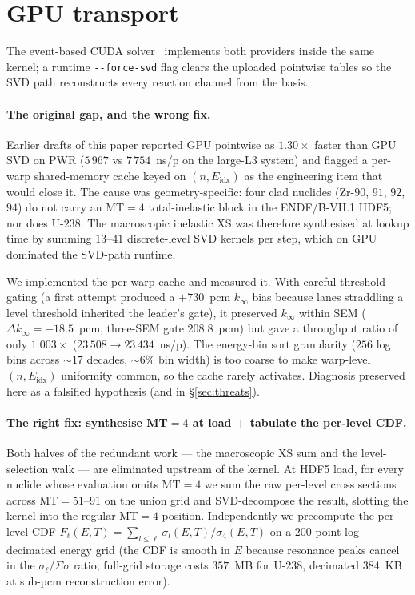 \section{GPU transport}
\label{sec:gpu}

The event-based CUDA solver~\cite{tramm2024} implements both
providers inside the same kernel; a runtime
\texttt{-{}-force-svd} flag clears the uploaded pointwise
tables so the SVD path reconstructs every reaction channel
from the basis.

\paragraph{The original gap, and the wrong fix.}
Earlier drafts of this paper reported GPU pointwise as
$1.30\times$ faster than GPU SVD on PWR ($5\,967$ vs $7\,754$~ns/p
on the large-L3 system) and flagged a per-warp shared-memory cache
keyed on $(n, E_\text{idx})$ as the engineering item that would
close it. The cause was geometry-specific: four clad nuclides
(Zr-$90$, $91$, $92$, $94$) do not carry an MT$=4$ total-inelastic
block in the ENDF/B-VII.1 HDF5; nor does U-$238$. The macroscopic
inelastic XS was therefore synthesised at lookup time by summing
$13$--$41$ discrete-level SVD kernels per step, which on GPU
dominated the SVD-path runtime.

We implemented the per-warp cache and measured it. With careful
threshold-gating (a first attempt produced a $+730$~pcm $k_\infty$
bias because lanes straddling a level threshold inherited the
leader's gate), it preserved $k_\infty$ within SEM
($\Delta k_\infty = -18.5$~pcm, three-SEM gate $208.8$~pcm) but
gave a throughput ratio of only $1.003\times$
($23\,508 \to 23\,434$~ns/p). The energy-bin sort granularity
($256$ log bins across $\sim\!17$ decades, $\sim\!6\%$ bin width) is
too coarse to make warp-level $(n, E_\text{idx})$ uniformity common,
so the cache rarely activates. Diagnosis preserved here as a
falsified hypothesis (and in §\ref{sec:threats}).

\paragraph{The right fix: synthesise MT$=4$ at load + tabulate the
per-level CDF.}
Both halves of the redundant work --- the macroscopic XS sum and
the level-selection walk --- are eliminated upstream of the kernel.
At HDF5 load, for every nuclide whose evaluation omits MT$=4$ we
sum the raw per-level cross sections across MT$=51$--$91$ on the
union grid and SVD-decompose the result, slotting the kernel into
the regular MT$=4$ position. Independently we precompute the
per-level CDF
\(F_\ell(E,T) = \sum_{l \leq \ell} \sigma_l(E,T) / \sigma_4(E,T)\)
on a $200$-point log-decimated energy grid (the CDF is smooth in $E$
because resonance peaks cancel in the $\sigma_\ell/\Sigma\sigma$
ratio; full-grid storage costs $357$~MB for U-$238$, decimated
$384$~KB at sub-pcm reconstruction error).

